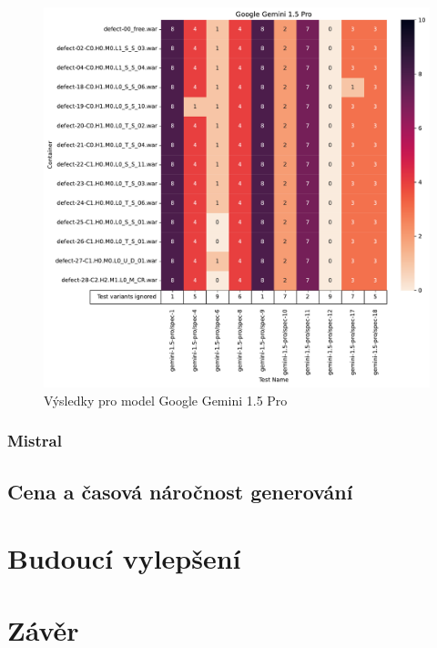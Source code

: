 \documentclass[czech, ma, kiv, he, iso690alph, pdf, viewonly]{fasthesis}
\begin{document}
            \begin{figure}
                \includegraphics[width=\textwidth]{pic/gemini-results.pdf}
                \caption{Výsledky pro model Google Gemini 1.5 Pro}
                \label{fig:res:gemini}
            \end{figure}

        \subsection{Mistral}

    \section{Cena a časová náročnost generování}

\chapter{Budoucí vylepšení}

\chapter{Závěr}

%
%
%
%
\backmatter
\printbibliography
\listoffigures
\listoftables
\listoflistings
%
%
\setbackpageqrcode
\backpage
\end{document}

